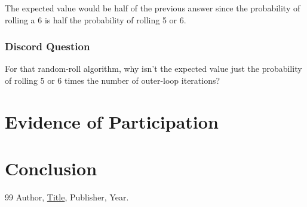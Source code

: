 \documentclass{article}
\theoremstyle{theorem}
\theoremstyle{definition}
\theoremstyle{remark}
\begin{document}
The expected value would be half of the previous answer since the probability of rolling a 6 is half the probability of rolling 5 or 6.

\vspace{0.3cm}

\subsubsection{Discord Question}

For that random-roll algorithm, why isn’t the expected value just the probability of rolling 5 or 6 times the number of outer-loop iterations?

\section{Evidence of Participation}

\section{Conclusion}\label{conclusion}

\begin{thebibliography}{99}
 Author, \href{https://en.wikipedia.org/wiki/LaTeX}{Title}, Publisher, Year.
\end{thebibliography}
\end{document}
